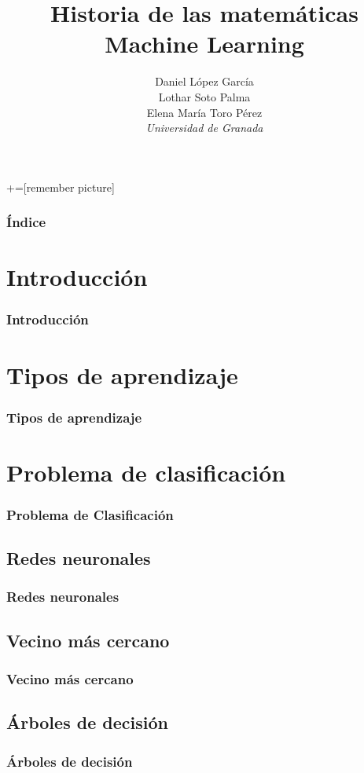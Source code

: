 \documentclass{beamer} %
\author{Daniel López García\\ Lothar Soto Palma\\ Elena María Toro Pérez\\\textit{Universidad de Granada}}
\title{Historia de las matemáticas\\ Machine Learning}
\begin{document}
+=[remember picture]

\everymath{\displaystyle}

\begin{frame}
\titlepage
\end{frame}

\begin{frame}
\frametitle{Índice}
\tableofcontents
\end{frame}

\section{Introducción}
	\begin{frame}
	\frametitle{Introducción}
	\end{frame}

\section{Tipos de aprendizaje}
	\begin{frame}
	\frametitle{Tipos de aprendizaje}
	\end{frame}

\section{Problema de clasificación}
	\begin{frame}
	\frametitle{Problema de Clasificación}
	\end{frame}
	
	\subsection{Redes neuronales}
		\begin{frame}
		\frametitle{Redes neuronales}
		\end{frame}
	\subsection{Vecino más cercano}
		\begin{frame}
		\frametitle{Vecino más cercano}
		\end{frame}
	\subsection{Árboles de decisión}
		\begin{frame}
		\frametitle{Árboles de decisión}
		\end{frame}
\end{document}
